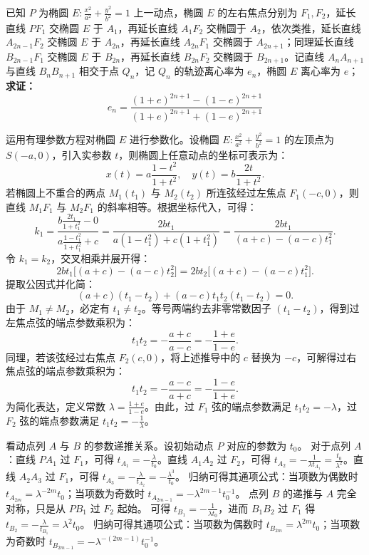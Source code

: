 \begin{exercise}
 已知 \(P\) 为椭圆 \(E: \frac{x^2}{a^2} + \frac{y^2}{b^2} = 1\) 上一动点，椭圆 \(E\) 的左右焦点分别为 \(F_1,F_2\)，延长直线 \(PF_1\) 交椭圆 \(E\) 于 \(A_1\)，再延长直线 \(A_1F_2\) 交椭圆于 \(A_2\)，依次类推，延长直线 \(A_{2n-1}F_2\) 交椭圆 \(E\) 于 \(A_{2n}\)，再延长直线 \(A_{2n}F_1\) 交椭圆于 \(A_{2n+1}\)；同理延长直线 \(B_{2n-1}F_1\) 交椭圆 \(E\) 于 \(B_{2n}\)，再延长直线 \(B_{2n}F_2\) 交椭圆于 \(B_{2n+1}\)。记直线 \(A_nA_{n+1}\) 与直线 \(B_nB_{n+1}\) 相交于点 \(Q_n\)，记 \(Q_n\) 的轨迹离心率为 \(e_n\)，椭圆 \(E\) 离心率为 \(e\)；\\
\textbf{求证：}
\[
e_n = \frac{(1+e)^{2n+1} - (1-e)^{2n+1}}{(1+e)^{2n+1} + (1-e)^{2n+1}}
\]
\end{exercise}
\begin{solution}
运用有理参数方程对椭圆 $E$ 进行参数化。设椭圆 $E: \frac{x^2}{a^2} + \frac{y^2}{b^2} = 1$ 的左顶点为 $S(-a,0)$，引入实参数 $t$，则椭圆上任意动点的坐标可表示为：
\[ x(t) = a \frac{1-t^2}{1+t^2}, \quad y(t) = b \frac{2t}{1+t^2}. \]
若椭圆上不重合的两点 $M_1(t_1)$ 与 $M_2(t_2)$ 所连弦经过左焦点 $F_1(-c, 0)$，则直线 $M_1 F_1$ 与 $M_2 F_1$ 的斜率相等。根据坐标代入，可得：
\[ k_{1} = \frac{b \frac{2t_1}{1+t_1^2} - 0}{a \frac{1-t_1^2}{1+t_1^2} + c} = \frac{2b t_1}{a(1-t_1^2) + c(1+t_1^2)} = \frac{2b t_1}{(a+c) - (a-c)t_1^2}. \]
令 $k_1 = k_2$，交叉相乘并展开得：
\[ 2b t_1 \big[ (a+c) - (a-c)t_2^2 \big] = 2b t_2 \big[ (a+c) - (a-c)t_1^2 \big]. \]
提取公因式并化简：
\[ (a+c)(t_1 - t_2) + (a-c)t_1 t_2 (t_1 - t_2) = 0. \]
由于 $M_1 \neq M_2$，必定有 $t_1 \neq t_2$。等号两端约去非零常数因子 $(t_1 - t_2)$，得到过左焦点弦的端点参数乘积为：
\[ t_1 t_2 = -\frac{a+c}{a-c} = -\frac{1+e}{1-e}. \]
同理，若该弦经过右焦点 $F_2(c, 0)$，将上述推导中的 $c$ 替换为 $-c$，可解得过右焦点弦的端点参数乘积为：
\[ t_1 t_2 = -\frac{a-c}{a+c} = -\frac{1-e}{1+e}. \]
为简化表达，定义常数 $\lambda = \frac{1+e}{1-e}$。由此，过 $F_1$ 弦的端点参数满足 $t_1 t_2 = -\lambda$，过 $F_2$ 弦的端点参数满足 $t_1 t_2 = -\frac{1}{\lambda}$。

看动点列 $A$ 与 $B$ 的参数递推关系。设初始动点 $P$ 对应的参数为 $t_0$。
对于点列 $A$：直线 $PA_1$ 过 $F_1$，可得 $t_{A_1} = -\frac{\lambda}{t_0}$。直线 $A_1 A_2$ 过 $F_2$，可得 $t_{A_2} = -\frac{1}{\lambda t_{A_1}} = \frac{t_0}{\lambda^2}$。直线 $A_2 A_3$ 过 $F_1$，可得 $t_{A_3} = -\frac{\lambda}{t_{A_2}} = -\frac{\lambda^3}{t_0}$。
归纳可得其通项公式：当项数为偶数时 $t_{A_{2m}} = \lambda^{-2m} t_0$；当项数为奇数时 $t_{A_{2m-1}} = -\lambda^{2m-1} t_0^{-1}$。
点列 $B$ 的递推与 $A$ 完全对称，只是从 $PB_1$ 过 $F_2$ 起始。
可得 $t_{B_1} = -\frac{1}{\lambda t_0}$，进而 $B_1 B_2$ 过 $F_1$ 得 $t_{B_2} = -\frac{\lambda}{t_{B_1}} = \lambda^2 t_0$。
归纳可得其通项公式：当项数为偶数时 $t_{B_{2m}} = \lambda^{2m} t_0$；当项数为奇数时 $t_{B_{2m-1}} = -\lambda^{-(2m-1)} t_0^{-1}$。


\end{solution}
